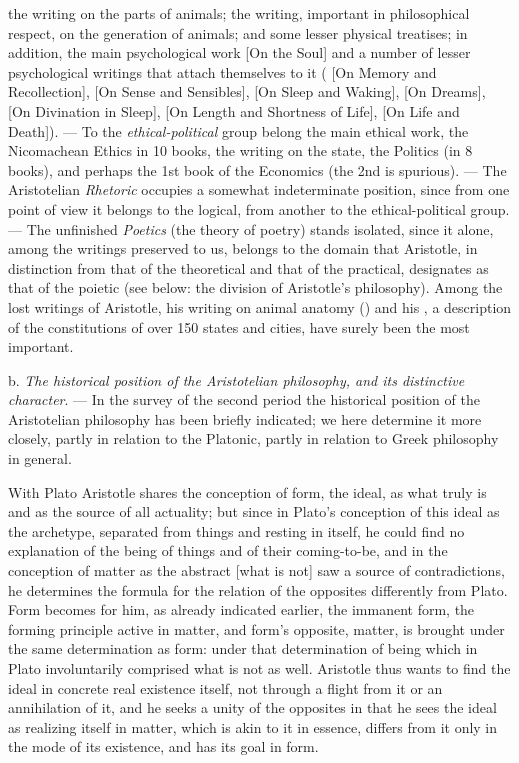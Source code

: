 the writing on the parts of animals; the writing, important in philosophical respect, on the generation of animals; and some lesser physical treatises; in addition, the main psychological work  [On the Soul]
and a number of lesser psychological writings that attach themselves to
it ( [On Memory and Recollection],  [On Sense and Sensibles],  [On Sleep and Waking],  [On Dreams], 
 [On Divination in Sleep],  [On Length and Shortness of Life],  [On Life and Death]). --- To the \emph{ethical-political} group belong the main ethical work, the Nicomachean Ethics in 10 books, the writing on the state, the Politics (in 8
books), and perhaps the 1st book of the Economics (the 2nd is spurious).
--- The Aristotelian \emph{Rhetoric} occupies a somewhat indeterminate
position, since from one point of view it belongs to the logical, from
another to the ethical-political group. --- The unfinished \emph{Poetics}
(the theory of poetry) stands isolated, since it alone, among the
writings preserved to us, belongs to the domain that Aristotle, in distinction from
that of the theoretical and that of the practical, designates as that of the poietic
(see below: the division of Aristotle's philosophy). Among
the lost writings of Aristotle, his writing on
animal anatomy () and his , a description
of the constitutions of over 150 states and cities, have surely been the most important.

\divrule

b. \emph{The historical position of the Aristotelian philosophy,
and its distinctive character}. --- In the survey of the second period
the historical position of the Aristotelian philosophy has been briefly
indicated; we here determine it more closely, partly in relation to the
Platonic, partly in relation to Greek philosophy in general.

With Plato Aristotle shares the conception of form, the ideal, as what
truly is and as the source of all actuality; but since in Plato's
conception of this ideal as the archetype, separated from things and
resting in itself, he could find no explanation of the being of things
and of their coming-to-be, and in the conception of matter as the
abstract  [what is not] saw a source of contradictions, he
determines the formula for the relation of the opposites differently
from Plato. Form becomes for him, as already indicated earlier, the
immanent form, the forming principle active in matter, and form's
opposite, matter, is brought under the same determination as form:
under that determination of being which in Plato involuntarily
comprised what is not as well. Aristotle thus wants to find the ideal
in concrete real existence itself, not through a flight from it or an
annihilation of it, and he seeks a unity of the opposites in that he
sees the ideal as realizing itself in matter, which is akin to it in
essence, differs from it only in the mode of its existence, and has its
goal in form.

